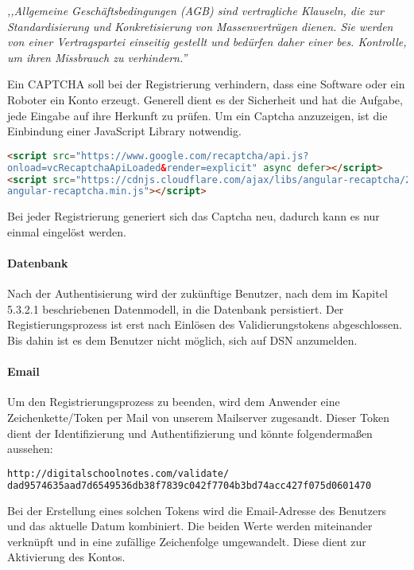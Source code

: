 \textit{,,Allgemeine Geschäftsbedingungen (AGB) sind vertragliche Klauseln, die zur Standardisierung und Konkretisierung von Massenverträgen dienen. Sie werden von einer Vertragspartei einseitig gestellt und bedürfen daher einer bes. Kontrolle, um ihren Missbrauch zu verhindern.''}\cite{AGB}\\
\cite{VERTEILTE_SYSTEME,PASSWORT_SCHUTZ}


\newpage

Ein \gls{CAPTCHA} soll bei der Registrierung verhindern, dass eine Software oder ein Roboter ein Konto erzeugt. Generell dient es der Sicherheit und hat die Aufgabe, jede Eingabe auf ihre Herkunft zu prüfen. Um ein Captcha anzuzeigen, ist die Einbindung einer JavaScript Library notwendig. \cite{CAPTCHA}
\begin{lstlisting}[caption={Einbindung der JS-Library Recaptcha}, language=HTML]
<script src="https://www.google.com/recaptcha/api.js?
onload=vcRecaptchaApiLoaded&render=explicit" async defer></script>
<script src="https://cdnjs.cloudflare.com/ajax/libs/angular-recaptcha/2.2.5/
angular-recaptcha.min.js"></script>
\end{lstlisting}

Bei jeder Registrierung generiert sich das Captcha neu, dadurch kann es nur einmal eingelöst werden.


\newpage

\paragraph{Datenbank}
Nach der Authentisierung wird der zukünftige Benutzer, nach dem im Kapitel 5.3.2.1 beschriebenen Datenmodell, in die Datenbank persistiert. Der Registierungsprozess ist erst nach Einlösen des Validierungstokens abgeschlossen. Bis dahin ist es dem Benutzer nicht möglich, sich auf DSN anzumelden.

\paragraph{Email}
Um den Registrierungsprozess zu beenden, wird dem Anwender eine Zeichenkette/Token per Mail von unserem Mailserver zugesandt. Dieser Token dient der Identifizierung und Authentifizierung und könnte folgendermaßen aussehen:
\begin{lstlisting}[caption={Validierungstoken für die Aktivierung des DSN-Accounts}, language=bash]
http://digitalschoolnotes.com/validate/
dad9574635aad7d6549536db38f7839c042f7704b3bd74acc427f075d0601470
\end{lstlisting}
Bei der Erstellung eines solchen Tokens wird die Email-Adresse des Benutzers und das aktuelle Datum kombiniert. Die beiden Werte werden miteinander verknüpft und in eine zufällige Zeichenfolge umgewandelt. Diese dient zur Aktivierung des Kontos.

